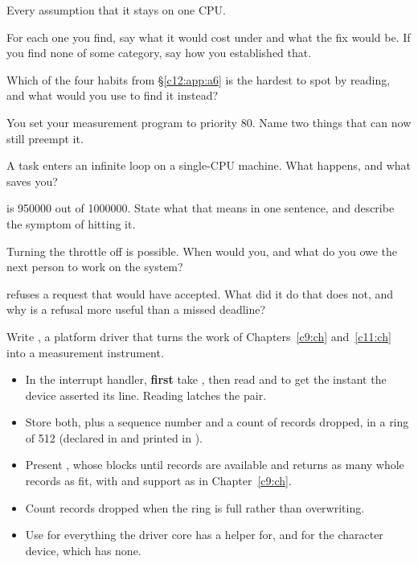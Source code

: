  Every assumption that it stays on one CPU.

For each one you find, say what it would cost under  and what the fix would be. If
you find none of some category, say how you established that.

 Which of the four habits from \S\ref{c12:app:a6} is the hardest to spot by reading, and
what would you use to find it instead?

\label{c12:ex:5}

 You set your measurement program to  priority 80. Name two things that
can now still preempt it.

 A  task enters an infinite loop on a single-CPU machine. What happens,
and what saves you?

  is 950000 out of 1000000. State what that means in one
sentence, and describe the symptom of hitting it.

 Turning the throttle off is possible. When would you, and what do you owe the next person
to work on the system?

  refuses a request that  would have accepted. What
did it do that  does not, and why is a refusal more useful than a missed deadline?

\label{c12:ex:6}

Write , a platform driver that turns the work of
Chapters~\ref{c9:ch} and~\ref{c11:ch} into a measurement instrument.
\begin{itemize}
  \item In the interrupt handler, \textbf{first} take , then read 
    and  to get the instant the device asserted its line. Reading  latches
    the pair.
  \item Store both, plus a sequence number and a count of records dropped, in a ring of 512
     (declared in  and printed
    in ).
  \item Present , whose  blocks until records are available and
    returns as many whole records as fit, with  and  support as in
    Chapter~\ref{c9:ch}.
  \item Count records dropped when the ring is full rather than overwriting.
  \item Use  for everything the driver core has a helper for, and
     for the character device, which has none.
\end{itemize}

